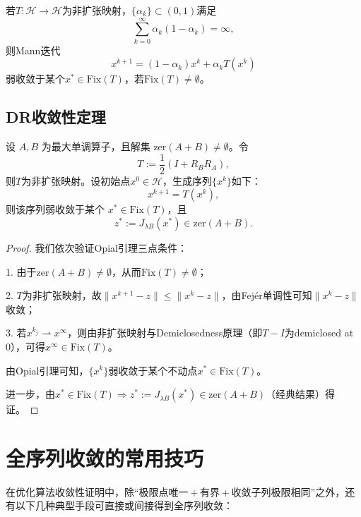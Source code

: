 \begin{lemma}
	若$T: \mathcal{H} \to \mathcal{H}$为非扩张映射，$\{\alpha_k\} \subset (0,1)$满足
	\[
	\sum_{k=0}^\infty \alpha_k (1 - \alpha_k) = \infty,
	\]
	则Mann迭代
	\[
	x^{k+1} = (1 - \alpha_k)x^k + \alpha_k T(x^k)
	\]
	弱收敛于某个$x^\ast \in \text{Fix}(T)$，若$\text{Fix}(T) \neq \emptyset$。
\end{lemma}

\subsection{DR收敛性定理}

\begin{theorem}
	设 $A, B$ 为最大单调算子，且解集 $\text{zer}(A + B) \neq \emptyset$。令
	\[
	T := \frac{1}{2}(I + R_B R_A),
	\]
	则$T$为非扩张映射。设初始点$x^0 \in \mathcal{H}$，生成序列$\{x^k\}$如下：
	\[
	x^{k+1} = T(x^k),
	\]
	则该序列弱收敛于某个 $x^\ast \in \text{Fix}(T)$，且
	\[
	z^\ast := J_{\lambda B}(x^\ast) \in \text{zer}(A + B).
	\]
\end{theorem}

\begin{proof}
	我们依次验证Opial引理三点条件：
	
	1. 由于$\text{zer}(A + B) \neq \emptyset$，从而$\text{Fix}(T) \neq \emptyset$；
	
	2. $T$为非扩张映射，故$\|x^{k+1} - z\| \leq \|x^k - z\|$，由Fejér单调性可知$\|x^k - z\|$收敛；
	
	3. 若$x^{k_j} \rightharpoonup x^\infty$，则由非扩张映射与Demiclosedness原理（即$T - I$为demiclosed at 0），可得$x^\infty \in \text{Fix}(T)$。
	
	由Opial引理可知，$\{x^k\}$弱收敛于某个不动点$x^\ast \in \text{Fix}(T)$。
	
	进一步，由$x^\ast \in \text{Fix}(T) \Rightarrow z^\ast := J_{\lambda B}(x^\ast) \in \text{zer}(A + B)$（经典结果）得证。
\end{proof}
\newpage
\section{全序列收敛的常用技巧}

在优化算法收敛性证明中，除“极限点唯一 + 有界 + 收敛子列极限相同”之外，还有以下几种典型手段可直接或间接得到全序列收敛：

